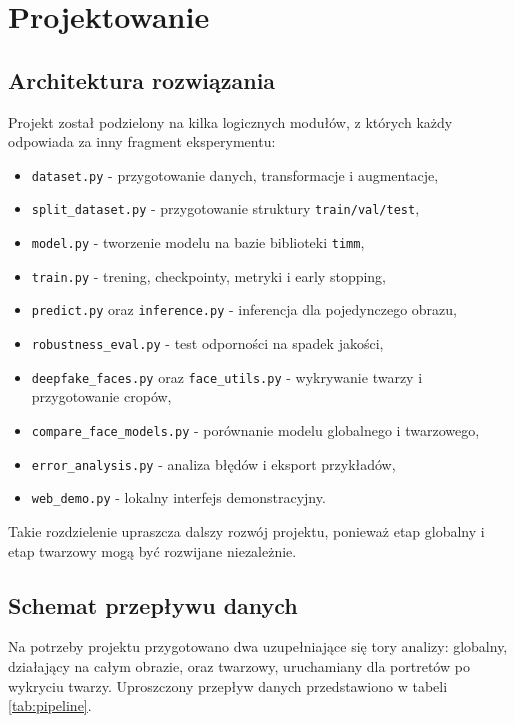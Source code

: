 \newpage
\section{Projektowanie}

\subsection{Architektura rozwiązania}

Projekt został podzielony na kilka logicznych modułów, z których każdy odpowiada za inny fragment eksperymentu:

\begin{itemize}
    \item \texttt{dataset.py} - przygotowanie danych, transformacje i augmentacje,
    \item \texttt{split\_dataset.py} - przygotowanie struktury \texttt{train/val/test},
    \item \texttt{model.py} - tworzenie modelu na bazie biblioteki \texttt{timm},
    \item \texttt{train.py} - trening, checkpointy, metryki i early stopping,
    \item \texttt{predict.py} oraz \texttt{inference.py} - inferencja dla pojedynczego obrazu,
    \item \texttt{robustness\_eval.py} - test odporności na spadek jakości,
    \item \texttt{deepfake\_faces.py} oraz \texttt{face\_utils.py} - wykrywanie twarzy i przygotowanie cropów,
    \item \texttt{compare\_face\_models.py} - porównanie modelu globalnego i twarzowego,
    \item \texttt{error\_analysis.py} - analiza błędów i eksport przykładów,
    \item \texttt{web\_demo.py} - lokalny interfejs demonstracyjny.
\end{itemize}

Takie rozdzielenie upraszcza dalszy rozwój projektu, ponieważ etap globalny i etap twarzowy mogą być rozwijane niezależnie.

\newpage
\subsection{Schemat przepływu danych}

Na potrzeby projektu przygotowano dwa uzupełniające się tory analizy: globalny, działający na całym obrazie, oraz twarzowy, uruchamiany dla portretów po wykryciu twarzy. Uproszczony przepływ danych przedstawiono w tabeli \ref{tab:pipeline}.

